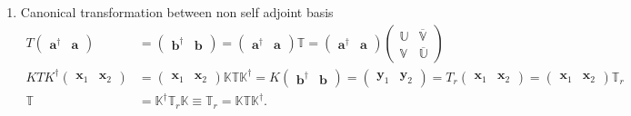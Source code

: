 \documentclass[aps, preprint]{revtex4}
\begin{document}
\begin{enumerate}
\item Canonical transformation between non self adjoint basis
\begin{align*}T \left (\begin{array}{cc}\mathbf{a}^{ \dag } & \mathbf{a}\end{array}\right ) &  =\left (\begin{array}{cc}\mathbf{b}^{ \dag } & \mathbf{b}\end{array}\right ) =\left (\begin{array}{cc}\mathbf{a}^{ \dag } & \mathbf{a}\end{array}\right ) \mathbb{T} =\left (\begin{array}{cc}\mathbf{a}^{ \dag } & \mathbf{a}\end{array}\right ) \left (\begin{array}{cc}\mathbb{U} & \overline{\mathbb{V}} \\
\mathbb{V} & \overline{\mathbb{U}}\end{array}\right ) \\
K T K^{ \dag } \left (\begin{array}{cc}\mathbf{x}_{1} & \mathbf{x}_{2}\end{array}\right ) &  =\left (\begin{array}{cc}\mathbf{x}_{1} & \mathbf{x}_{2}\end{array}\right ) \mathbb{K} \mathbb{T} \mathbb{K}^{ \dag } =K \left (\begin{array}{cc}\mathbf{b}^{ \dag } & \mathbf{b}\end{array}\right ) =\left (\begin{array}{cc}\mathbf{y}_{1} & \mathbf{y}_{2}\end{array}\right ) =T_{r} \left (\begin{array}{cc}\mathbf{x}_{1} & \mathbf{x}_{2}\end{array}\right ) =\left (\begin{array}{cc}\mathbf{x}_{1} & \mathbf{x}_{2}\end{array}\right ) \mathbb{T}_{r} \\
\mathbb{T} &  =\mathbb{K}^{ \dag } \mathbb{T}_{r} \mathbb{K} \equiv \mathbb{T}_{r} =\mathbb{K} \mathbb{T} \mathbb{K}^{ \dag }\text{.}\end{align*}\end{enumerate}
\end{document}
